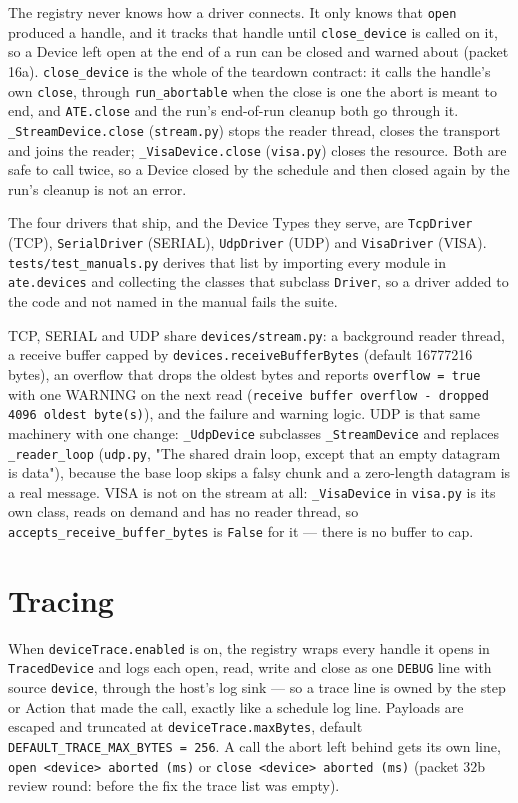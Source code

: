 The registry never knows how a driver connects. It only knows that \texttt{open} produced a handle, and
it tracks that handle until \texttt{close\_device} is called on it, so a Device left open at the end of a
run can be closed and warned about (packet 16a). \texttt{close\_device} is the whole of the teardown
contract: it calls the handle's own \texttt{close}, through \texttt{run\_abortable} when the close is one
the abort is meant to end, and \texttt{ATE.close} and the run's end-of-run cleanup both go through it.
\texttt{\_StreamDevice.close} (\texttt{stream.py}) stops the reader thread, closes the transport and joins
the reader; \texttt{\_VisaDevice.close} (\texttt{visa.py}) closes the resource. Both are safe to call
twice, so a Device closed by the schedule and then closed again by the run's cleanup is not an error.

The four drivers that ship, and the Device Types they serve, are \texttt{TcpDriver} (TCP),
\texttt{SerialDriver} (SERIAL), \texttt{UdpDriver} (UDP) and \texttt{VisaDriver} (VISA).
\texttt{tests/\allowbreak{}test\_\allowbreak{}manuals.py} derives that list by importing every module in \texttt{ate.devices} and
collecting the classes that subclass \texttt{Driver}, so a driver added to the code and not named in the
manual fails the suite.

TCP, SERIAL and UDP share \texttt{devices/stream.py}: a background reader thread, a receive buffer
capped by \texttt{devices.receiveBufferBytes} (default 16777216 bytes), an overflow that drops the oldest
bytes and reports \texttt{overflow = true} with one WARNING on the next read
(\texttt{receive buffer overflow - dropped 4096 oldest byte(s)}), and the failure and warning logic.
UDP is that same machinery with one change: \texttt{\_UdpDevice} subclasses \texttt{\_StreamDevice} and
replaces \texttt{\_reader\_loop} (\texttt{udp.py}, "The shared drain loop, except that an empty datagram
is data"), because the base loop skips a falsy chunk and a zero-length datagram is a real message. VISA
is not on the stream at all: \texttt{\_VisaDevice} in \texttt{visa.py} is its own class, reads on demand
and has no reader thread, so \texttt{accepts\_\allowbreak{}receive\_\allowbreak{}buffer\_\allowbreak{}bytes} is \texttt{False} for it --- there
is no buffer to cap.

\section{Tracing}

When \texttt{deviceTrace.enabled} is on, the registry wraps every handle it opens in
\texttt{TracedDevice} and logs each open, read, write and close as one \texttt{DEBUG} line with source
\texttt{device}, through the host's log sink --- so a trace line is owned by the step or Action that made
the call, exactly like a schedule log line. Payloads are escaped and truncated at
\texttt{deviceTrace.maxBytes}, default \texttt{DEFAULT\_\allowbreak{}TRACE\_\allowbreak{}MAX\_\allowbreak{}BYTES = 256}. A call the abort left
behind gets its own line, \texttt{open <device> aborted (ms)} or \texttt{close <device> aborted (ms)}
(packet 32b review round: before the fix the trace list was empty).

